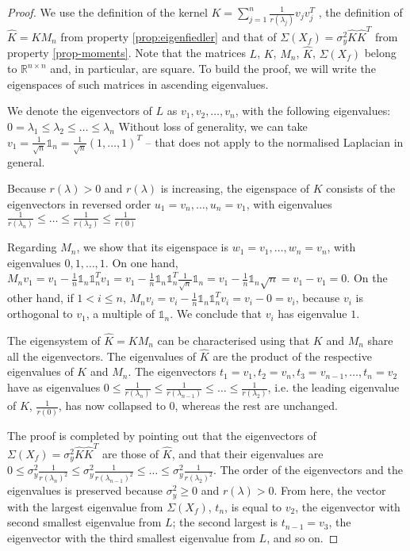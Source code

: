 \documentclass[12pt]{article}  %
\begin{document}
\begin{proof}

We use the definition of the kernel $K = \sum_{j = 1}^n \frac{1}{r(\lambda_j)} v_jv_j^T$ \cite{smola2003kernels}, the definition of $\hat{K} = KM_n$ from property \ref{prop:eigenfiedler} and that of $\Sigma(X_f) = \sigma_y^2 \hat{K} \hat{K}^T$ from property \ref{prop-moments}. 
Note that the matrices $L$, $K$, $M_n$, $\hat{K}$, $\Sigma(X_f)$ belong to $\mathds{R}^{n \times n}$ and, in particular, are square. 
To build the proof, we will write the eigenspaces of such matrices in ascending eigenvalues. 

We denote the eigenvectors of $L$ as $v_1, v_2, \ldots, v_n$, with the following eigenvalues: $ 0 = \lambda_1 \leq \lambda_2 \leq \ldots \leq \lambda_n $
Without loss of generality, we can take $v_1 = \frac{1}{\sqrt{n}}\mathds{1}_n = \frac{1}{\sqrt{n}}(1, \ldots, 1)^T$ -- that does not apply to the normalised Laplacian in general.

Because $r(\lambda) > 0$ and $r(\lambda)$ is increasing, the eigenspace of $K$ consists of the eigenvectors in reversed order $u_1 = v_n, \ldots, u_n = v_1$, with eigenvalues $ \frac{1}{r(\lambda_n)} \leq \ldots \leq \frac{1}{r(\lambda_2)} \leq \frac{1}{r(0)}$

Regarding $M_n$, we show that its eigenspace is $w_1 = v_1, \ldots, w_n = v_n$, with eigenvalues $0, 1, \ldots, 1$.
On one hand, $M_n v_1 = v_1 - \frac{1}{n} \mathds{1}_n\mathds{1}_n^T v_1 = v_1 - \frac{1}{n} \mathds{1}_n\mathds{1}_n^T \frac{1}{\sqrt{n}}\mathds{1}_n = v_1 - \frac{1}{n} \mathds{1}_n \sqrt{n} = v_1 - v_1 = 0$. 
On the other hand, if $1 < i \leq n$, $M_n v_i = v_i - \frac{1}{n} \mathds{1}_n\mathds{1}_n^T v_i = v_i - 0 = v_i$, because $v_i$ is orthogonal to $v_1$, a multiple of $\mathds{1}_n$. 
We conclude that $v_i$ has eigenvalue $1$. 

The eigensystem of $\hat{K} = KM_n$ can be characterised using that $K$ and $M_n$ share all the eigenvectors.
The eigenvalues of $\hat{K}$ are the product of the respective eigenvalues of $K$ and $M_n$. 
The eigenvectors $t_1 = v_1, t_2 = v_{n}, t_3 = v_{n-1}, \ldots, t_n = v_2$ have as eigenvalues $0 \leq \frac{1}{r(\lambda_n)} \leq \frac{1}{r(\lambda_{n-1})} \leq \ldots \leq \frac{1}{r(\lambda_2)}$, i.e. the leading eigenvalue of $K$, $\frac{1}{r(0)}$, has now collapsed to $0$, whereas the rest are unchanged.

The proof is completed by pointing out that the eigenvectors of $\Sigma(X_f) = \sigma_y^2 \hat{K} \hat{K}^T$ are those of $\hat{K}$, and that their eigenvalues are $0 \leq \sigma_y^2 \frac{1}{r(\lambda_n)^2} \leq \sigma_y^2 \frac{1}{r(\lambda_{n-1})^2} \leq \ldots \leq \sigma_y^2 \frac{1}{r(\lambda_2)^2}$.
The order of the eigenvectors and the eigenvalues is preserved because $\sigma_y^2 \geq 0$ and $r(\lambda) > 0$.
From here, the vector with the largest eigenvalue from $\Sigma(X_f)$, $t_n$, is equal to $v_2$, the eigenvector with second smallest eigenvalue from $L$; the second largest is $t_{n-1} = v_3$, the eigenvector with the third smallest eigenvalue from $L$, and so on.


\end{proof}
\end{document}
